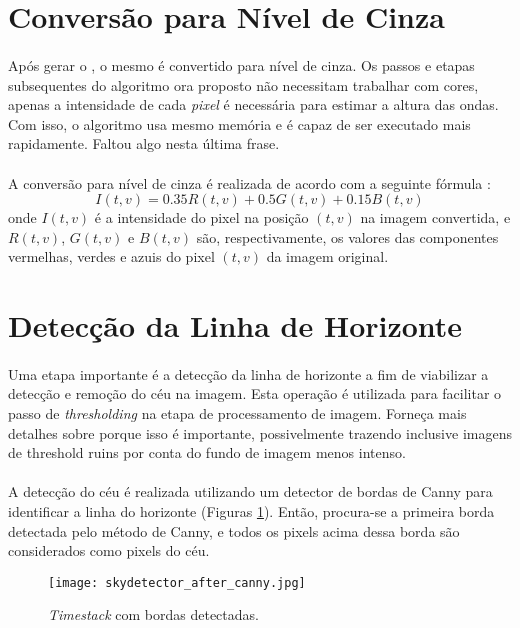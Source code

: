 \section{Conversão para Nível de Cinza}
\paragraph{}Após gerar o \timestack, o mesmo é convertido para nível de cinza. Os passos e etapas subsequentes do algoritmo ora proposto não necessitam trabalhar com cores, apenas a intensidade de cada \textit{pixel} é necessária para estimar a altura das ondas. Com isso, o algoritmo usa mesmo memória e é capaz de ser executado mais rapidamente. Faltou algo nesta última frase.
\paragraph{}A conversão para nível de cinza é realizada de acordo com a seguinte fórmula \cite{Griffith14}:
\[
        I(t, v) = 0.35R(t, v) + 0.5G(t, v) + 0.15B(t, v)
\]
\noindent{}onde \(I(t,v)\) é a intensidade do pixel na posição \((t,v)\) na imagem convertida, e \(R(t,v)\), \(G(t,v)\) e \(B(t,v)\) são, respectivamente, os valores das componentes vermelhas, verdes e azuis do pixel \((t,v)\) da imagem original.
\section{Detecção da Linha de Horizonte}
\paragraph{}Uma etapa importante é a detecção da linha de horizonte a fim de viabilizar a detecção e remoção do céu na imagem. Esta operação é utilizada para facilitar o passo de \textit{thresholding} na etapa de processamento de imagem. Forneça mais detalhes sobre porque isso é importante, possivelmente trazendo inclusive imagens de threshold ruins por conta do fundo de imagem menos intenso.
\paragraph{}A detecção do céu é realizada utilizando um detector de bordas de Canny para identificar a linha do horizonte (Figuras \ref{FigTimestackSkyCanny}). Então, procura-se a primeira borda detectada pelo método de Canny, e todos os pixels acima dessa borda são considerados como pixels do céu.
\begin{figure}[h]
\begin{center}
  \texttt{[image: skydetector\_after\_canny.jpg]}
  \caption[\small{Timestack com bordas detectadas pelo método de Canny. A primeira borda identificada é a linha do horizonte.}]{\label{FigTimestackSkyCanny} \small{\textit{Timestack} com bordas detectadas.}}
\end{center}
\end{figure}
